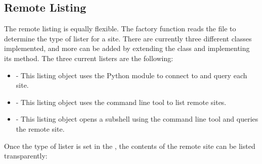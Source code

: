 \subsection{Remote Listing}
\label{\detokenize{listing:remote-listing}}\label{\detokenize{listing:remote-listing-ref}}
The remote listing is equally flexible.
The factory function {\hyperref[\detokenize{backend:dynamo_consistency.backend.get_listers}]{}} reads the {\hyperref[\detokenize{cms:consistency-config-ref}]{}}
file to determine the type of lister for a site.
There are currently three different classes implemented,
and more can be added by extending the  class and
implementing its  method.
The three current listers are the following:
\begin{itemize}
\item {} 
 -
This listing object uses the  Python module to connect to and query each site.

\item {} 
 -
This listing object uses the  command line tool to list remote sites.

\item {} 
 -
This listing object opens a subshell using the  command line tool and queries the remote site.

\end{itemize}

Once the type of lister is set in the {\hyperref[\detokenize{cms:consistency-config-ref}]{}},
the contents of the remote site can be listed transparently:

\begin{sphinxVerbatim}[commandchars=\\\{\}]
   

  
\end{sphinxVerbatim}

